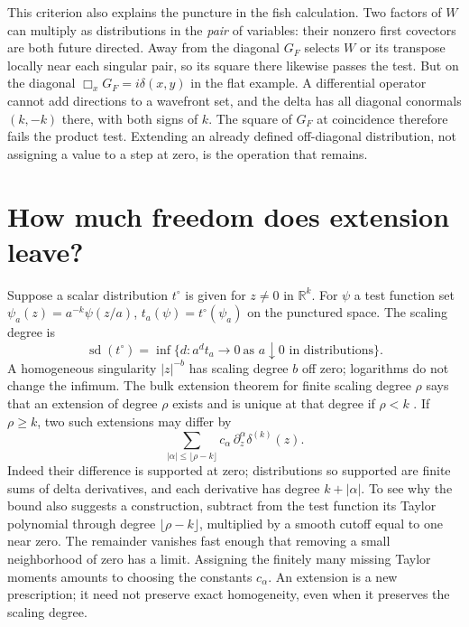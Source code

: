 This criterion also explains the puncture in the fish calculation. Two
factors of $W$ can multiply as distributions in the \emph{pair} of
variables: their nonzero first covectors are both future directed. Away
from the diagonal $G_F$ selects $W$ or its transpose locally near each
singular pair, so its square there likewise passes the test. But on the
diagonal $\Box_x G_F=i\delta(x,y)$ in the flat example. A differential
operator cannot add directions to a wavefront set, and the delta has all
diagonal conormals $(k,-k)$ there, with both signs of $k$. The square of
$G_F$ at coincidence therefore fails the product test. Extending an
already defined off-diagonal distribution, not assigning a value to a
step at zero, is the operation that remains.

\section{How much freedom does extension leave?}
Suppose a scalar distribution $t^\circ$ is given for $z\ne0$ in
$\mathbb R^k$. For $\psi$ a test function set
$\psi_a(z)=a^{-k}\psi(z/a)$, $t_a(\psi)=t^\circ(\psi_a)$ on the
punctured space. The scaling degree is
\[
 \operatorname{sd}(t^\circ)=
 \inf\{d:a^d t_a\longrightarrow0\ \text{as }a\downarrow0
                     \text{ in distributions}\} .
\]
A homogeneous singularity $|z|^{-b}$ has scaling degree $b$ off zero;
logarithms do not change the infimum. The bulk extension theorem for finite
scaling degree $\rho$ says that an extension of degree $\rho$ exists and
is unique at that degree if $\rho<k$ \cite{BF}. If $\rho\ge k$, two such
extensions may differ by
\[
 \sum_{|\alpha|\le\lfloor\rho-k\rfloor} c_\alpha\,
                                \partial_z^\alpha\delta^{(k)}(z) .
\]
Indeed their difference is supported at zero; distributions so supported
are finite sums of delta derivatives, and each derivative has degree
$k+|\alpha|$. To see why the bound also suggests a construction, subtract
from the test function its Taylor polynomial through degree
$\lfloor\rho-k\rfloor$, multiplied by a smooth cutoff equal to one near
zero. The remainder vanishes fast enough that removing a small neighborhood
of zero has a limit. Assigning the finitely many missing Taylor moments
amounts to choosing the constants $c_\alpha$. An extension is a new
prescription; it need not preserve exact homogeneity, even when it
preserves the scaling degree.

